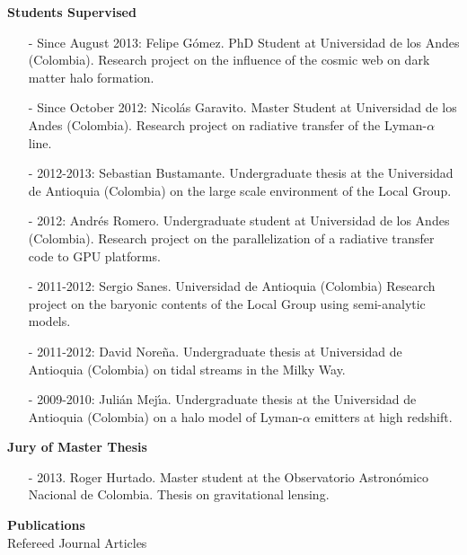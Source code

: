 \documentclass[9pt]{article}
\begin{document}
{\bf Students Supervised}
\begin{itemize}

\item[-] Since August 2013: Felipe G\'omez. PhD Student at
  Universidad de los Andes (Colombia). Research project on the
  influence of the cosmic web on dark matter halo formation. 
\item[-] Since October 2012: Nicol\'as Garavito. Master Student
  at Universidad de los Andes (Colombia). Research project on
  radiative transfer of the  Lyman-$\alpha$ line.  
\item[-] 2012-2013: Sebastian Bustamante. Undergraduate thesis at the
  Universidad de Antioquia (Colombia) on the large scale environment
  of the Local Group. 
\item[-] 2012: Andr\'es Romero. Undergraduate student at Universidad
  de los Andes (Colombia). Research project on the parallelization of
  a radiative transfer code to GPU platforms. 
\item[-] 2011-2012: Sergio Sanes.
  Universidad de Antioquia (Colombia) Research project on the baryonic contents of the
  Local Group using semi-analytic models. 
\item[-]2011-2012: David Nore\~na. Undergraduate thesis at Universidad
  de Antioquia (Colombia) on tidal streams in the Milky Way. 
\item[-]2009-2010: Juli\'an Mej\'{\i}a. Undergraduate thesis at the
  Universidad de Antioquia (Colombia) on a halo model of
  Lyman-$\alpha$ emitters at high redshift. 
\end{itemize}


{\bf Jury of Master Thesis}
\begin{itemize}
\item[-] 2013. Roger Hurtado. Master student at the Observatorio Astron\'omico Nacional de Colombia. Thesis on gravitational lensing.
\end{itemize}

{\bf Publications}\\

\indent
Refereed Journal Articles\\
\end{document}
